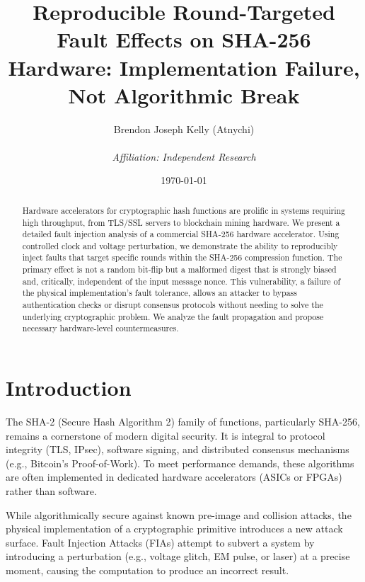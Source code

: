 \documentclass[11pt, a4paper]{article}
\title{Reproducible Round-Targeted Fault Effects on SHA-256 Hardware: Implementation Failure, Not Algorithmic Break}
\author{Brendon Joseph Kelly (Atnychi) \\\\ \textit{Affiliation: Independent Research}}
\date{\today}
\begin{document}
\maketitle
\pagestyle{headings} %

\begin{abstract}
Hardware accelerators for cryptographic hash functions are prolific in systems requiring high throughput, from TLS/SSL servers to blockchain mining hardware. We present a detailed fault injection analysis of a commercial SHA-256 hardware accelerator. Using controlled clock and voltage perturbation, we demonstrate the ability to reproducibly inject faults that target specific rounds within the SHA-256 compression function. The primary effect is not a random bit-flip but a malformed digest that is strongly biased and, critically, independent of the input message nonce. This vulnerability, a failure of the physical implementation's fault tolerance, allows an attacker to bypass authentication checks or disrupt consensus protocols without needing to solve the underlying cryptographic problem. We analyze the fault propagation and propose necessary hardware-level countermeasures.
\end{abstract}

\section{Introduction}
The SHA-2 (Secure Hash Algorithm 2) family of functions, particularly SHA-256, remains a cornerstone of modern digital security. It is integral to protocol integrity (TLS, IPsec), software signing, and distributed consensus mechanisms (e.g., Bitcoin's Proof-of-Work). To meet performance demands, these algorithms are often implemented in dedicated hardware accelerators (ASICs or FPGAs) rather than software.

While algorithmically secure against known pre-image and collision attacks, the physical implementation of a cryptographic primitive introduces a new attack surface. Fault Injection Attacks (FIAs) attempt to subvert a system by introducing a perturbation (e.g., voltage glitch, EM pulse, or laser) at a precise moment, causing the computation to produce an incorrect result.
\end{document}
